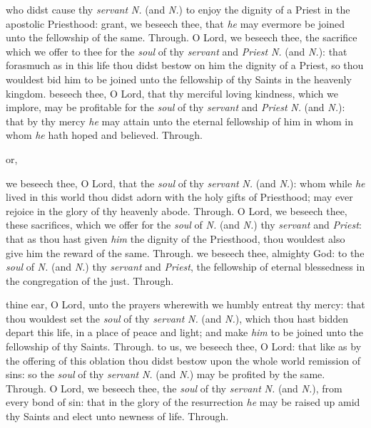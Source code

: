 \begin{multicols}{2}
 who didst cause thy \textit{servant} \textit{N.} (and \textit{N.}) to enjoy the dignity of a Priest in the apostolic Priesthood: grant, we beseech thee, that \textit{he} may evermore be joined unto the fellowship of the same. Through.
 O Lord, we beseech thee, the sacrifice which we offer to thee for the \textit{soul} of thy \textit{servant} and \textit{Priest} \textit{N.} (and \textit{N.}): that forasmuch as in this life thou didst bestow on him the dignity of a Priest, so thou wouldest bid him to be joined unto the fellowship of thy Saints in the heavenly kingdom.
 beseech thee, O Lord, that thy merciful loving kindness, which we implore, may be profitable for the \textit{soul} of thy \textit{servant} and \textit{Priest} \textit{N.} (and \textit{N.}): that by thy mercy \textit{he} may attain unto the eternal fellowship of him in whom in whom \textit{he} hath hoped and believed. Through.
\begin{inhead}
    or,
\end{inhead}
\vspace{-1\baselineskip}
 we beseech thee, O Lord, that the \textit{soul} of thy \textit{servant} \textit{N.} (and \textit{N.}): whom while \textit{he} lived in this world thou didst adorn with the holy gifts of Priesthood; may ever rejoice in the glory of thy heavenly abode. Through.
 O Lord, we beseech thee, these sacrifices, which we offer for the \textit{soul} of \textit{N.} (and \textit{N.}) thy \textit{servant} and \textit{Priest}: that as thou hast given \textit{him} the dignity of the Priesthood, thou wouldest also give him the reward of the same. Through.
 we beseech thee, almighty God: to the \textit{soul} of \textit{N.} (and \textit{N.}) thy \textit{servant} and \textit{Priest}, the fellowship of eternal blessedness in the congregation of the just. Through.

 thine ear, O Lord, unto the prayers wherewith we humbly entreat thy mercy: that thou wouldest set the \textit{soul} of thy \textit{servant} \textit{N.} (and \textit{N.}), which thou hast bidden depart this life, in a place of peace and light; and make \textit{him} to be joined unto the fellowship of thy Saints. Through.
 to us, we beseech thee, O Lord: that like as by the offering of this oblation thou didst bestow upon the whole world remission of sins: so the \textit{soul} of thy \textit{servant} \textit{N.} (and \textit{N.}) may be profited by the same. Through.
 O Lord, we beseech thee, the \textit{soul} of thy \textit{servant} \textit{N.} (and \textit{N.}), from every bond of sin: that in the glory of the resurrection \textit{he} may be raised up amid thy Saints and elect unto newness of life. Through.



\end{multicols}
